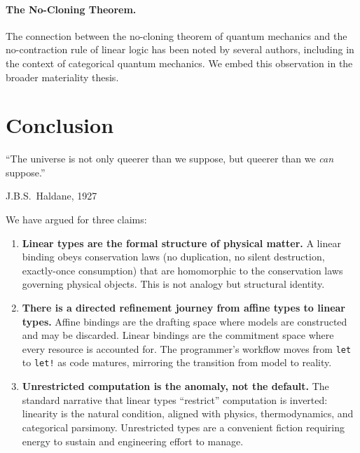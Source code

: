 \documentclass[11pt,a4paper]{article}
\newcommand{\letbang}{\texttt{let!}}
\newcommand{\letkw}{\texttt{let}}
\begin{document}
\paragraph{The No-Cloning Theorem.}
The connection between the no-cloning theorem of quantum mechanics
\citep{wootters1982nocloning} and the no-contraction rule of linear
logic has been noted by several authors, including
\citet{abramsky2004categorical} in the context of categorical quantum
mechanics. We embed this observation in the broader materiality
thesis.


\section{Conclusion}
\label{sec:conclusion}

\epigraph{%
  ``The universe is not only queerer than we suppose, but queerer than
  we \emph{can} suppose.''
}{J.B.S.\ Haldane, 1927}

\bigskip

We have argued for three claims:

\begin{enumerate}
\item \textbf{Linear types are the formal structure of physical
  matter.} A linear binding obeys conservation laws (no duplication,
  no silent destruction, exactly-once consumption) that are
  homomorphic to the conservation laws governing physical objects.
  This is not analogy but structural identity.

\item \textbf{There is a directed refinement journey from affine
  types to linear types.} Affine bindings are the drafting space
  where models are constructed and may be discarded. Linear bindings
  are the commitment space where every resource is accounted for.
  The programmer's workflow moves from \letkw{} to \letbang{} as
  code matures, mirroring the transition from model to reality.

\item \textbf{Unrestricted computation is the anomaly, not the
  default.} The standard narrative that linear types ``restrict''
  computation is inverted: linearity is the natural condition,
  aligned with physics, thermodynamics, and categorical parsimony.
  Unrestricted types are a convenient fiction requiring energy to
  sustain and engineering effort to manage.
\end{enumerate}
\end{document}
